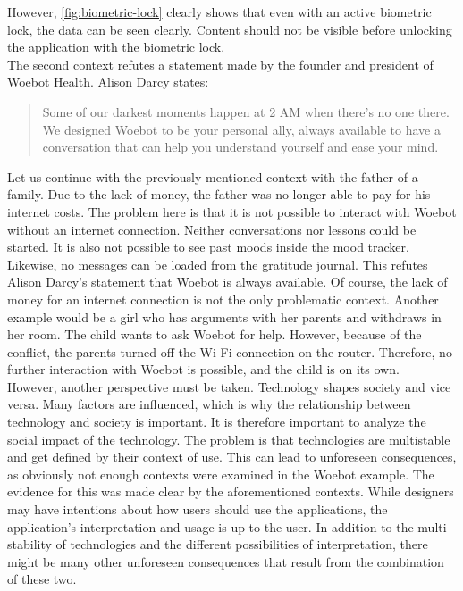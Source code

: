 However, \autoref{fig:biometric-lock} clearly shows that even with an active biometric lock, the data can be seen clearly.
Content should not be visible before unlocking the application with the biometric lock.\\

The second context refutes a statement made by the founder and president of Woebot Health.
Alison Darcy states\cite{woebot-about}:
\begin{quote}
    Some of our darkest moments happen at 2 AM when there's no one there.
    We designed Woebot to be your personal ally, always available to have a conversation that can help you understand yourself and ease your mind.
\end{quote}
Let us continue with the previously mentioned context with the father of a family.
Due to the lack of money, the father was no longer able to pay for his internet costs.
The problem here is that it is not possible to interact with Woebot without an internet connection.
Neither conversations nor lessons could be started.
It is also not possible to see past moods inside the mood tracker.
Likewise, no messages can be loaded from the gratitude journal.
This refutes Alison Darcy's statement that Woebot is always available.
Of course, the lack of money for an internet connection is not the only problematic context.
Another example would be a girl who has arguments with her parents and withdraws in her room.
The child wants to ask Woebot for help. 
However, because of the conflict, the parents turned off the Wi-Fi connection on the router.
Therefore, no further interaction with Woebot is possible, and the child is on its own.\\

However, another perspective must be taken.
Technology shapes society and vice versa\cite{materializing-morality}.
Many factors are influenced, which is why the relationship between technology and society is important.
It is therefore important to analyze the social impact of the technology.
The problem is that technologies are multistable and get defined by their context of use\cite{ihde-multistable}.
This can lead to unforeseen consequences, as obviously not enough contexts were examined in the Woebot example.
The evidence for this was made clear by the aforementioned contexts.
While designers may have intentions about how users should use the applications, the application's interpretation and usage is up to the user.
In addition to the multi-stability of technologies and the different possibilities of interpretation, there might be many other unforeseen consequences that result from the combination of these two.\\

